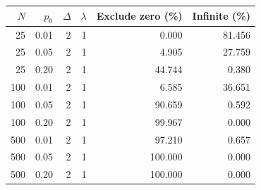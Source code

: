 \begin{tabular}{rrrrrr}
\toprule
$N$ & $p_0$ & $\Delta$ & $\lambda$ & Exclude zero (\%) & Infinite (\%)\\
\midrule
25 & 0.01 & 2 & 1 & 0.000 & 81.456\\
25 & 0.05 & 2 & 1 & 4.905 & 27.759\\
25 & 0.20 & 2 & 1 & 44.744 & 0.380\\
100 & 0.01 & 2 & 1 & 6.585 & 36.651\\
100 & 0.05 & 2 & 1 & 90.659 & 0.592\\
100 & 0.20 & 2 & 1 & 99.967 & 0.000\\
500 & 0.01 & 2 & 1 & 97.210 & 0.657\\
500 & 0.05 & 2 & 1 & 100.000 & 0.000\\
500 & 0.20 & 2 & 1 & 100.000 & 0.000\\
\bottomrule
\end{tabular}
